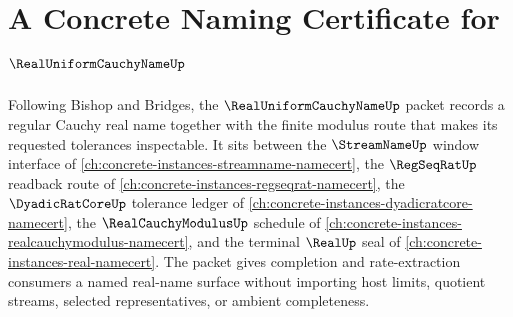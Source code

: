 \chapter{A Concrete Naming Certificate for $\RealUniformCauchyNameUp$}
\label{ch:concrete-instances-real-uniform-cauchy-name-namecert}

Following Bishop and Bridges, the $\RealUniformCauchyNameUp$ packet records a regular Cauchy real name together with the finite modulus route that makes its requested tolerances inspectable. It sits between the $\StreamNameUp$ window interface of \autoref{ch:concrete-instances-streamname-namecert}, the $\RegSeqRatUp$ readback route of \autoref{ch:concrete-instances-regseqrat-namecert}, the $\DyadicRatCoreUp$ tolerance ledger of \autoref{ch:concrete-instances-dyadicratcore-namecert}, the $\RealCauchyModulusUp$ schedule of \autoref{ch:concrete-instances-realcauchymodulus-namecert}, and the terminal $\RealUp$ seal of \autoref{ch:concrete-instances-real-namecert}. The packet gives completion and rate-extraction consumers a named real-name surface without importing host limits, quotient streams, selected representatives, or ambient completeness.

